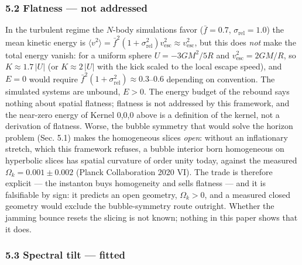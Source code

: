 \documentclass[
  11pt,
]{article}
\begin{document}
\hypertarget{flatness-not-addressed}{%
\subsubsection{\texorpdfstring{\textbf{5.2 Flatness --- not
addressed}}{5.2 Flatness --- not addressed}}\label{flatness-not-addressed}}

In the turbulent regime the \(N\)-body simulations favor
(\(\bar{f} = 0.7\), \(\sigma_{\text{rel}} = 1.0\)) the mean kinetic
energy is
\(\langle v^2\rangle = \bar{f}^2(1+\sigma_{\text{rel}}^2)v_{\text{esc}}^2 \approx v_{\text{esc}}^2\),
but this does \emph{not} make the total energy vanish: for a uniform
sphere \(U = -3GM^2/5R\) and \(v_{\text{esc}}^2 = 2GM/R\), so
\(K \approx 1.7\,|U|\) (or \(K \approx 2\,|U|\) with the kick scaled to
the local escape speed), and \(E = 0\) would require
\(\bar{f}^2(1+\sigma_{\text{rel}}^2) \approx 0.3\)--\(0.6\) depending on
convention. The simulated systems are unbound, \(E > 0\). The energy
budget of the rebound says nothing about spatial flatness; flatness is
not addressed by this framework, and the near-zero energy of Kernel
0,0,0 above is a definition of the kernel, not a derivation of flatness.
Worse, the bubble symmetry that would solve the horizon problem (Sec.
5.1) makes the homogeneous slices \emph{open}: without an inflationary
stretch, which this framework refuses, a bubble interior born
homogeneous on hyperbolic slices has spatial curvature of order unity
today, against the measured \(\Omega_k = 0.001 \pm 0.002\) (Planck
Collaboration 2020 VI). The trade is therefore explicit --- the
instanton buys homogeneity and sells flatness --- and it is falsifiable
by sign: it predicts an open geometry, \(\Omega_k > 0\), and a measured
closed geometry would exclude the bubble-symmetry route outright.
Whether the jamming bounce resets the slicing is not known; nothing in
this paper shows that it does.

\hypertarget{spectral-tilt-fitted}{%
\subsubsection{\texorpdfstring{\textbf{5.3 Spectral tilt ---
fitted}}{5.3 Spectral tilt --- fitted}}\label{spectral-tilt-fitted}}
\end{document}
